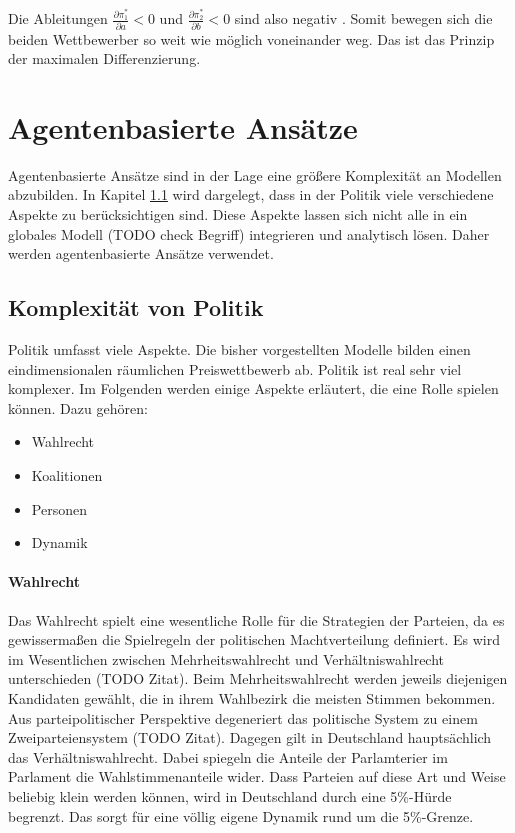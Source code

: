 Die Ableitungen $\frac{\partial \pi_1^*}{\partial a}<0$ und $\frac{\partial \pi_2^*}{\partial b}<0$ sind also negativ \citep[S.\,1149]{aspremont1979}.
Somit bewegen sich die beiden Wettbewerber so weit wie möglich voneinander weg. Das ist das Prinzip der maximalen Differenzierung.

\section{Agentenbasierte Ansätze}\label{Sec-ABM}
Agentenbasierte Ansätze sind in der Lage eine größere Komplexität an Modellen abzubilden. In Kapitel \ref{sec:ABM-Komplexität} wird dargelegt, dass in der Politik viele verschiedene Aspekte zu berücksichtigen sind. Diese Aspekte lassen sich nicht alle in ein globales Modell (TODO check Begriff) integrieren und analytisch lösen. Daher werden agentenbasierte Ansätze verwendet.

\subsection{Komplexität von Politik} \label{sec:ABM-Komplexität}
Politik umfasst viele Aspekte. Die bisher vorgestellten Modelle bilden einen eindimensionalen räumlichen Preiswettbewerb ab. Politik ist real sehr viel komplexer. Im Folgenden werden einige Aspekte erläutert, die eine Rolle spielen können. Dazu gehören:
\begin{itemize}
	\item Wahlrecht
	\item Koalitionen
	\item Personen
	\item Dynamik
\end{itemize}

\paragraph{Wahlrecht}
Das Wahlrecht spielt eine wesentliche Rolle für die Strategien der Parteien, da es gewissermaßen die Spielregeln der politischen Machtverteilung definiert. Es wird im Wesentlichen zwischen Mehrheitswahlrecht und Verhältniswahlrecht unterschieden (TODO Zitat). Beim Mehrheitswahlrecht werden jeweils diejenigen Kandidaten gewählt, die in ihrem Wahlbezirk die meisten Stimmen bekommen. Aus parteipolitischer Perspektive degeneriert das politische System zu einem Zweiparteiensystem (TODO Zitat). Dagegen gilt in Deutschland hauptsächlich das Verhältniswahlrecht. Dabei spiegeln die Anteile der Parlamterier im Parlament die Wahlstimmenanteile wider. Dass Parteien auf diese Art und Weise beliebig klein werden können, wird in Deutschland durch eine 5\%-Hürde begrenzt. Das sorgt für eine völlig eigene Dynamik rund um die 5\%-Grenze.


